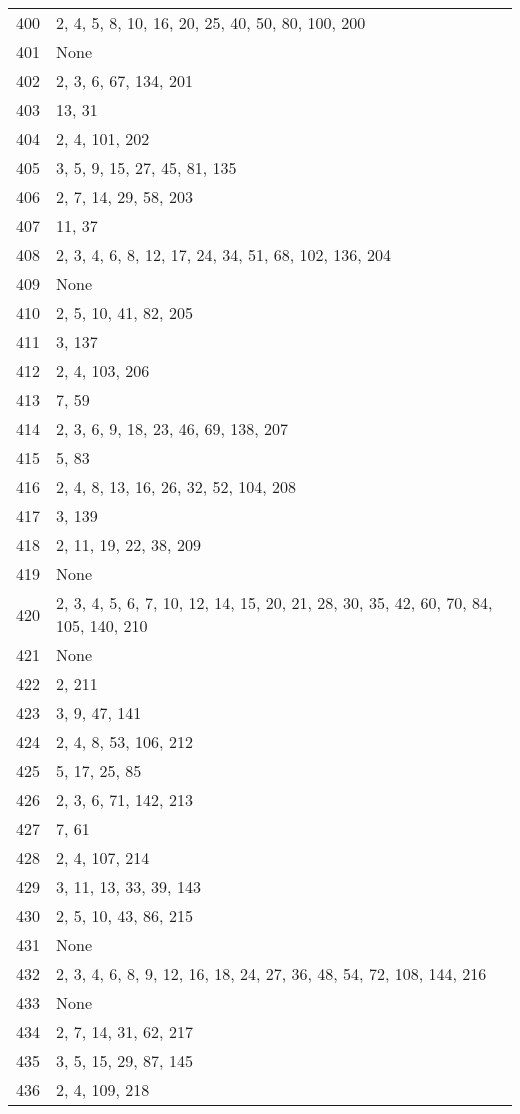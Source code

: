 \documentclass[12pt]{article}
\begin{document}
\begin{tabular}{|r|l|}
400 & 2, 4, 5, 8, 10, 16, 20, 25, 40, 50, 80, 100, 200 \\ 
401 & None \\ 
402 & 2, 3, 6, 67, 134, 201 \\ 
403 & 13, 31 \\ 
404 & 2, 4,  101, 202 \\ 
405 & 3, 5, 9, 15, 27, 45, 81, 135 \\ 
406 & 2, 7,  14, 29, 58, 203 \\ 
407 & 11, 37 \\ 
408 & 2, 3, 4, 6, 8, 12, 17, 24, 34, 51, 68, 102, 136, 204 \\ 
409 & None \\ 
410 & 2, 5, 10, 41, 82, 205 \\ 
411 & 3, 137 \\ 
412 & 2, 4, 103, 206 \\ 
413 & 7, 59 \\ 
414 & 2, 3, 6, 9, 18, 23, 46, 69, 138, 207 \\ 
415 & 5, 83 \\ 
416 & 2, 4, 8, 13, 16, 26, 32, 52, 104, 208 \\ 
417 & 3, 139 \\ 
418 & 2, 11, 19, 22, 38, 209 \\ 
419 & None \\ 
420 & 2, 3, 4, 5, 6, 7, 10, 12, 14, 15, 20, 21, 28, 30, 35, 42, 60, 70, 84, 105, 140, 210 \\ 
421 & None \\ 
422 & 2, 211 \\ 
423 & 3, 9, 47, 141 \\ 
424 & 2, 4, 8, 53, 106, 212 \\ 
425 & 5, 17, 25, 85 \\ 
426 & 2,  3, 6, 71, 142, 213 \\ 
427 & 7,  61 \\ 
428 & 2, 4, 107, 214 \\ 
429 & 3, 11, 13, 33, 39, 143 \\ 
430 & 2, 5, 10, 43, 86, 215 \\ 
431 & None \\ 
432 & 2, 3, 4, 6, 8, 9, 12, 16, 18, 24, 27, 36, 48,  54, 72, 108, 144, 216 \\ 
433 & None \\ 
434 & 2, 7, 14, 31, 62, 217 \\ 
435 & 3, 5, 15, 29, 87, 145 \\ 
436 & 2, 4, 109, 218 \\ 

\end{tabular}
\end{document}
